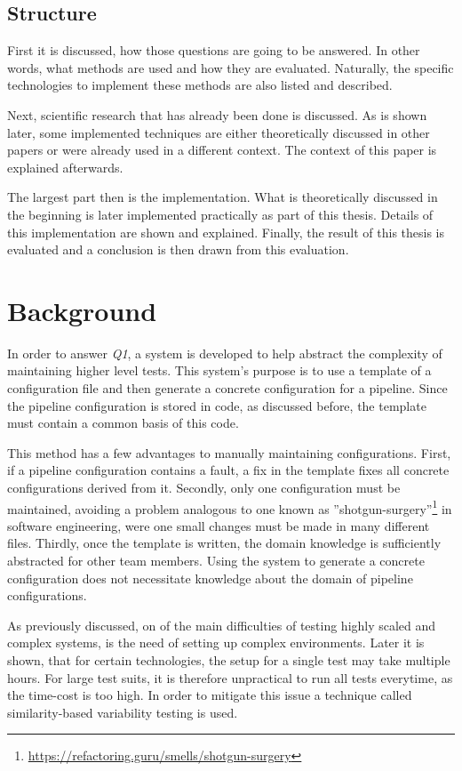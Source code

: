 \section{Structure}\label{sec:structure}

First it is discussed, how those questions are going to be answered.
In other words, what methods are used and how they are evaluated.
Naturally, the specific technologies to implement these methods are also listed and described.

Next, scientific research that has already been done is discussed.
As is shown later, some implemented techniques are either theoretically discussed in other papers or were already used in a different context.
The context of this paper is explained afterwards.

The largest part then is 
the implementation.
What is theoretically discussed in the beginning is later implemented practically as part of this thesis.
Details of this implementation are shown and explained.
Finally, the result of this thesis is evaluated and a conclusion is then drawn from this evaluation.

\chapter{Background}\label{ch:background}

In order to answer \textit{Q1}, a system is developed to help abstract the complexity of maintaining higher level tests.
This system's purpose is to use a template of a configuration file and then generate a concrete configuration for a pipeline.
Since the pipeline configuration is stored in code, as discussed before, the template must contain a common basis of this code.

This method has a few advantages to manually maintaining configurations.
First, if a pipeline configuration contains a fault, a fix in the template fixes all concrete configurations derived from it.
Secondly, only one configuration must be maintained, avoiding a problem analogous to one known as ''shotgun-surgery''\footnote{\url{https://refactoring.guru/smells/shotgun-surgery}} in software engineering, were one small changes must be made in many different files.
Thirdly, once the template is written, the domain knowledge is sufficiently abstracted for other team members.
Using the system to generate a concrete configuration does not necessitate knowledge about the domain of pipeline configurations.

As previously discussed, on of the main difficulties of testing highly scaled and complex systems, is the need of setting up complex environments.
Later it is shown, that for certain technologies, the setup for a single test may take multiple hours.
For large test suits, it is therefore unpractical to run all tests everytime, as the time-cost is too high.
In order to mitigate this issue a technique called similarity-based variability testing is used.

